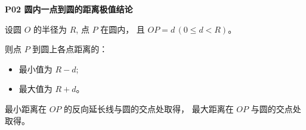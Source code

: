 \begin{statementbox}
\textbf{P02 圆内一点到圆的距离极值结论}

设圆 $O$ 的半径为 $R$,
点 $P$ 在圆内，
且 $OP=d\,(0\le d<R)$。

则点 $P$ 到圆上各点距离的：

\begin{itemize}
  \item 最小值为 $R-d$;
  \item 最大值为 $R+d$。
\end{itemize}

最小距离在 $OP$ 的反向延长线与圆的交点处取得，
最大距离在 $OP$ 与圆的交点处取得。
\end{statementbox}
